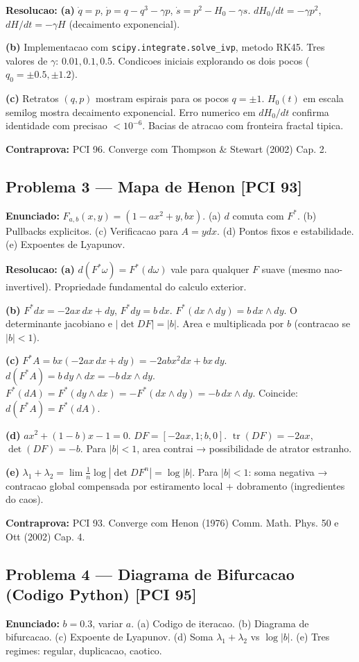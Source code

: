 \documentclass[12pt,a4paper,oneside]{article}
\begin{document}
\textbf{Resolucao:}
\textbf{(a)} $\dot q=p$, $\dot p=q-q^3-\gamma p$, $\dot s=p^2-H_0-\gamma s$.
$dH_0/dt=-\gamma p^2$, $dH/dt=-\gamma H$ (decaimento exponencial).

\textbf{(b)} Implementacao com \texttt{scipy.integrate.solve\_ivp}, metodo RK45. Tres valores de $\gamma$: $0.01,0.1,0.5$. Condicoes iniciais explorando os dois pocos ($q_0=\pm0.5,\pm1.2$).

\textbf{(c)} Retratos $(q,p)$ mostram espirais para os pocos $q=\pm1$. $H_0(t)$ em escala semilog mostra decaimento exponencial. Erro numerico em $dH_0/dt$ confirma identidade com precisao $<10^{-6}$. Bacias de atracao com fronteira fractal tipica.

\textbf{Contraprova:} PCI 96. Converge com Thompson \& Stewart (2002) Cap. 2.

\subsection{Problema 3 — Mapa de Henon [PCI 93]}
\textbf{Enunciado:} $F_{a,b}(x,y)=(1-ax^2+y,bx)$.
(a) $d$ comuta com $F^*$. (b) Pullbacks explicitos. (c) Verificacao para $A=ydx$.
(d) Pontos fixos e estabilidade. (e) Expoentes de Lyapunov.

\textbf{Resolucao:}
\textbf{(a)} $d(F^*\omega)=F^*(d\omega)$ vale para qualquer $F$ suave (mesmo nao-invertivel). Propriedade fundamental do calculo exterior.

\textbf{(b)} $F^*dx=-2ax\,dx+dy$, $F^*dy=b\,dx$. $F^*(dx\wedge dy)=b\,dx\wedge dy$. O determinante jacobiano e $|\det DF|=|b|$. Area e multiplicada por $b$ (contracao se $|b|<1$).

\textbf{(c)} $F^*A=bx(-2ax\,dx+dy)=-2abx^2dx+bx\,dy$. $d(F^*A)=b\,dy\wedge dx=-b\,dx\wedge dy$. $F^*(dA)=F^*(dy\wedge dx)=-F^*(dx\wedge dy)=-b\,dx\wedge dy$. Coincide: $d(F^*A)=F^*(dA)$.

\textbf{(d)} $ax^2+(1-b)x-1=0$. $DF=[-2ax,1;b,0]$. $\operatorname{tr}(DF)=-2ax$, $\det(DF)=-b$. Para $|b|<1$, area contrai → possibilidade de atrator estranho.

\textbf{(e)} $\lambda_1+\lambda_2=\lim\frac1n\log|\det DF^n|=\log|b|$. Para $|b|<1$: soma negativa → contracao global compensada por estiramento local + dobramento (ingredientes do caos).

\textbf{Contraprova:} PCI 93. Converge com Henon (1976) Comm. Math. Phys. 50 e Ott (2002) Cap. 4.

\subsection{Problema 4 — Diagrama de Bifurcacao (Codigo Python) [PCI 95]}
\textbf{Enunciado:} $b=0.3$, variar $a$.
(a) Codigo de iteracao. (b) Diagrama de bifurcacao. (c) Expoente de Lyapunov.
(d) Soma $\lambda_1+\lambda_2$ vs $\log|b|$. (e) Tres regimes: regular, duplicacao, caotico.
\end{document}

